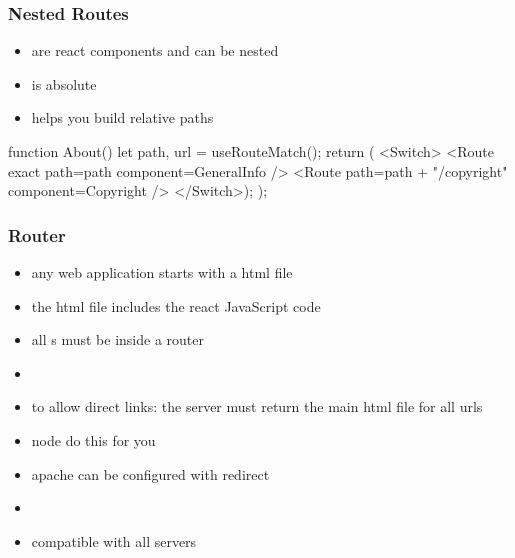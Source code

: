 \begin{frame}[fragile] \frametitle{Nested Routes}
\begin{itemize}
  \item {} are react components and can be nested
  \item {} is absolute
  \item {} helps you build relative paths
\end{itemize}
\begin{CodeBox}{}
function About() {
  let { path, url } = useRouteMatch();
  return (
      <Switch>
        <Route exact path={path} component={GeneralInfo} />
        <Route path={path + "/copyright"} 
                 component={Copyright} />
      </Switch>);
  );
}
\end{CodeBox}
\end{frame}

\begin{frame}[fragile] \frametitle{Router}

\begin{itemize}
  \item any web application starts with a html file  
  \item the html file includes the react JavaScript code
  \item all s must be inside a router
\end{itemize}

\begin{itemize}
  \item {}
  \item to allow direct links: the server must return the main html file for all urls
  \item node do this for you
  \item apache can be configured with redirect
\end{itemize}

\begin{itemize}
  \item {}
  \item compatible with all servers
\end{itemize}
\end{frame}

